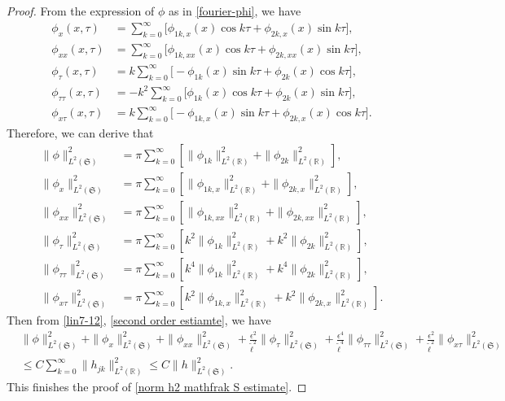 \documentclass[10pt, reqno]{amsart}
\numberwithin{equation}{section}
\theoremstyle{definition}
\begin{document}
{{\begin{proof}
 From the expression of $\phi$ as in \eqref{fourier-phi}, we have
\begin{align*}
 \phi_x(x, \tau) &= \sum_{k=0}^\infty \Big[\phi_{1k, x} (x)\cos k\tau + \phi_{2k, x} (x)\sin k\tau\Big],
 \\[2mm]
 \phi_{xx}(x, \tau) &= \sum_{k=0}^\infty \Big[\phi_{1k, xx} (x)\cos k\tau + \phi_{2k, xx} (x)\sin k\tau\Big],
 \\[2mm]
 \phi_\tau(x, \tau) & = k\sum_{k=0}^\infty \Big[-\phi_{1k} (x)\sin k\tau + \phi_{2k} (x)\cos k\tau\Big],
 \\[2mm]
 \phi_{\tau\tau}(x, \tau) & = -k^2\sum_{k=0}^\infty \Big[\phi_{1k} (x)\cos k\tau + \phi_{2k} (x)\sin k\tau\Big],
 \\[2mm]
 \phi_{x\tau}(x, \tau) & = k\sum_{k=0}^\infty \Big[-\phi_{1k, x} (x)\sin k\tau + \phi_{2k,x} (x)\cos k\tau\Big].
\end{align*}
Therefore, we can derive that
\begin{align*}
 \|\phi\|_{L^2(\mathfrak S)}^2 & =\pi \sum_{k=0}^\infty \left[\|\phi_{1k}\|^2_{L^2({\mathbb R})}+ \|\phi_{2k}\|^2_{L^2({\mathbb R})}\right],
 \\[2mm]
 \|\phi_x\|_{L^2(\mathfrak S)}^2 & = \pi\sum_{k=0}^\infty \left[\|\phi_{1k, x}\|^2_{L^2({\mathbb R})}+ \|\phi_{2k, x}\|^2_{L^2({\mathbb R})}\right],
 \\[2mm]
 \|\phi_{xx}\|_{L^2(\mathfrak S)}^2 &= \pi \sum_{k=0}^\infty \left[\|\phi_{1k, xx}\|^2_{L^2({\mathbb R})}+ \|\phi_{2k, xx}\|^2_{L^2({\mathbb R})}\right],
 \\[2mm]
 \|\phi_\tau\|_{L^2(\mathfrak S)}^2 &= \pi \sum_{k=0}^\infty \left[k^2\|\phi_{1k}\|^2_{L^2({\mathbb R})}+ k^2\|\phi_{2k}\|^2_{L^2({\mathbb R})}\right],
 \\[2mm]
 \|\phi_{\tau\tau}\|_{L^2(\mathfrak S)}^2 &=\pi \sum_{k=0}^\infty \left[k^4\|\phi_{1k}\|^2_{L^2({\mathbb R})}+ k^4\|\phi_{2k}\|^2_{L^2({\mathbb R})}\right],
 \\[2mm]
 \|\phi_{x\tau}\|_{L^2(\mathfrak S)}^2 &= \pi \sum_{k=0}^\infty \left[k^2\|\phi_{1k, x}\|^2_{L^2({\mathbb R})}+ k^2\|\phi_{2k,x}\|^2_{L^2({\mathbb R})}\right].
\end{align*}
 Then from \eqref{lin7-12}, \eqref{second order estiamte}, we have
\begin{align*}
 &\|\phi\|_{L^2(\mathfrak S)}^2 + \|\phi_x\|_{L^2(\mathfrak S)}^2 + \|\phi_{xx}\|_{L^2(\mathfrak S)}^2+ \frac{\epsilon^2}{\tilde\ell^2} \|\phi_\tau\|_{L^2(\mathfrak S)}^2 + \frac{\epsilon^4}{\tilde\ell^4} \|\phi_{\tau\tau}\|_{L^2(\mathfrak S)}^2 + \frac{\epsilon^2}{\tilde\ell^2} \|\phi_{x\tau}\|_{L^2(\mathfrak S)}^2
\nonumber\\[2mm]
 & \leq C\sum_{k=0}^\infty \|h_{jk}\|^2_{L^2({\mathbb R})} \leq  C\|h\|_{L^2(\mathfrak S)}^2.
\end{align*}
This finishes the proof of \eqref{norm h2 mathfrak S estimate}.



\end{proof}}}
\end{document}
